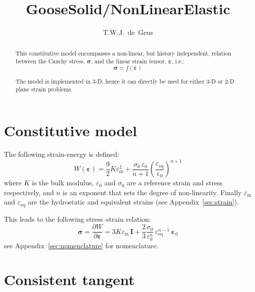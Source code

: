\documentclass[times,namecite]{goose-article}
\title{%
  GooseSolid/NonLinearElastic
}
\author{T.W.J.~de~Geus}
\begin{document}
\maketitle

\begin{abstract}
This constitutive model encompasses a non-linear, but history independent, relation between the Cauchy stress, $\bm{\sigma}$, and the linear strain tensor, $\bm{\varepsilon}$, i.e.:
\begin{equation*}
  \bm{\sigma} = f \left( \bm{\varepsilon} \right)
\end{equation*}

The model is implemented in 3-D, hence it can directly be used for either 3-D or 2-D plane strain problems.
\end{abstract}


\setcounter{tocdepth}{2}
\tableofcontents

\vfill\newpage
\section{Constitutive model}

The following strain-energy is defined:
%
\begin{equation}
  W ( \bm{\varepsilon} )
  = \frac{9}{2} K \varepsilon_\mathrm{m}^2
  + \frac{ \sigma_0 \, \varepsilon_0 }{ n+1 }
    \left( \frac{\varepsilon_\mathrm{eq}}{\mathrm{\varepsilon_0}} \right)^{n+1}
\end{equation}
%
where $K$ is the bulk modulus, $\varepsilon_0$ and $\sigma_0$ are a reference strain and stress respectively, and $n$ is an exponent that sets the degree of non-linearity. Finally $\varepsilon_\mathrm{m}$ and $\varepsilon_\mathrm{eq}$ are the hydrostatic and equivalent strains (see Appendix~\ref{sec:strain}).

This leads to the following stress--strain relation:
%
\begin{equation}
\label{eq:stress}
  \bm{\sigma}
  = \frac{\partial W}{\partial \bm{\varepsilon}}
  = 3 K \varepsilon_\mathrm{m} \, \bm{I}
  + \frac{2}{3} \frac{\sigma_0}{\varepsilon_0^n} \,
    \varepsilon_\mathrm{eq}^{n-1} \, \bm{\varepsilon}_\mathrm{d}
\end{equation}
%
see Appendix~\ref{sec:nomenclature} for nomenclature.

\section{Consistent tangent}
\end{document}

